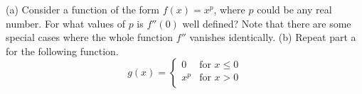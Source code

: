 (a) Consider a function of the form $f(x)=x^p$, where $p$ could be
any real number. For what values of $p$ is $f''(0)$ well defined?
Note that there are some special cases where the whole function $f''$
vanishes identically.\hwendpart
(b) Repeat part a for the following function.
\begin{equation*}
  g(x) = \begin{cases}
    0 & \text{for $x\le 0$}\\ 
    x^p & \text{for $x>0$}\\ 
  \end{cases}
\end{equation*}
